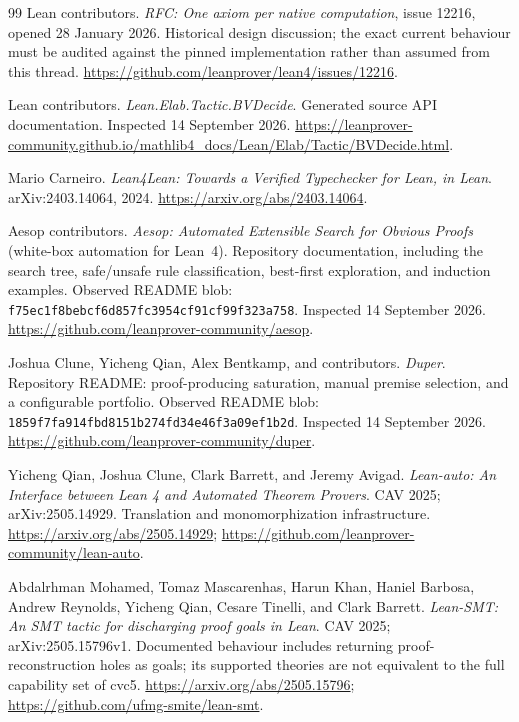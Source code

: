 \begin{thebibliography}{99}
Lean contributors. \emph{RFC: One axiom per native computation}, issue 12216,
opened 28 January 2026. Historical design discussion; the exact current
behaviour must be audited against the pinned implementation rather than
assumed from this thread.
\url{https://github.com/leanprover/lean4/issues/12216}.

Lean contributors. \emph{Lean.Elab.Tactic.BVDecide}. Generated source API
documentation. Inspected 14 September 2026.
\url{https://leanprover-community.github.io/mathlib4_docs/Lean/Elab/Tactic/BVDecide.html}.

Mario Carneiro. \emph{Lean4Lean: Towards a Verified Typechecker for Lean,
in Lean}. arXiv:2403.14064, 2024.
\url{https://arxiv.org/abs/2403.14064}.


Aesop contributors. \emph{Aesop: Automated Extensible Search for Obvious
Proofs} (white-box automation for Lean~4). Repository documentation,
including the search tree, safe/unsafe rule classification, best-first
exploration, and induction examples. Observed README blob:
\texttt{f75ec1f8bebcf6d857fc3954cf91cf99f323a758}. Inspected
14 September 2026.
\url{https://github.com/leanprover-community/aesop}.

Joshua Clune, Yicheng Qian, Alex Bentkamp, and contributors. \emph{Duper}.
Repository README: proof-producing saturation, manual premise selection, and
a configurable portfolio. Observed README blob:
\texttt{1859f7fa914fbd8151b274fd34e46f3a09ef1b2d}. Inspected
14 September 2026.
\url{https://github.com/leanprover-community/duper}.

Yicheng Qian, Joshua Clune, Clark Barrett, and Jeremy Avigad.
\emph{Lean-auto: An Interface between Lean 4 and Automated Theorem Provers}.
CAV 2025; arXiv:2505.14929. Translation and monomorphization infrastructure.
\url{https://arxiv.org/abs/2505.14929};
\url{https://github.com/leanprover-community/lean-auto}.

Abdalrhman Mohamed, Tomaz Mascarenhas, Harun Khan, Haniel Barbosa,
Andrew Reynolds, Yicheng Qian, Cesare Tinelli, and Clark Barrett.
\emph{Lean-SMT: An SMT tactic for discharging proof goals in Lean}.
CAV 2025; arXiv:2505.15796v1. Documented behaviour includes returning
proof-reconstruction holes as goals; its supported theories are not
equivalent to the full capability set of cvc5.
\url{https://arxiv.org/abs/2505.15796};
\url{https://github.com/ufmg-smite/lean-smt}.


\end{thebibliography}
